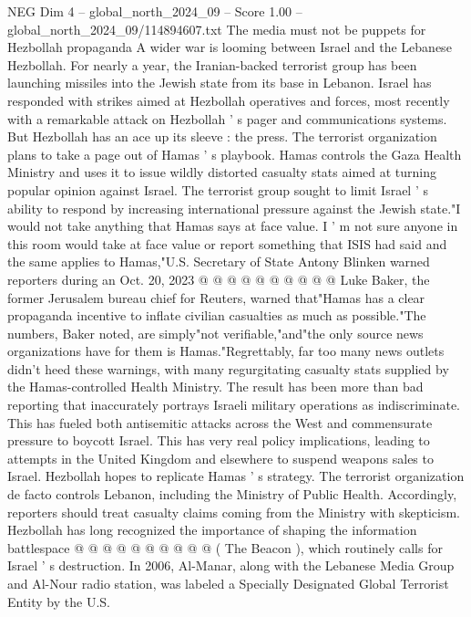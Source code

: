 \begin{textsample}{NEG Dim 4 – global\_north\_2024\_09 – Score 1.00 – global\_north\_2024\_09/114894607.txt}  \label{ex:f4_neg_132}
The media must not be puppets for Hezbollah propaganda A wider war is looming between Israel and the Lebanese Hezbollah.
For nearly a year, the Iranian-backed terrorist group has been launching missiles into the Jewish state from its base in Lebanon.
Israel has responded with strikes aimed at Hezbollah operatives and forces, most recently with a remarkable attack on Hezbollah ' s pager and communications systems.
But Hezbollah has an ace up its sleeve : the press.
The terrorist organization plans to take a page out of Hamas ' s playbook.
Hamas controls the Gaza Health Ministry and uses it to issue wildly distorted casualty stats aimed at turning popular opinion against Israel.
The terrorist group sought to limit Israel ' s ability to respond by increasing international pressure against the Jewish state."I would not take anything that Hamas says at face value.
I ' m not sure anyone in this room would take at face value or report something that ISIS had said and the same applies to Hamas,"U.S.
Secretary of State Antony Blinken warned reporters during an Oct. 20, 2023 @ @ @ @ @ @ @ @ @ @ Luke Baker, the former Jerusalem bureau chief for Reuters, warned that"Hamas has a clear propaganda incentive to inflate civilian casualties as much as possible."The numbers, Baker noted, are simply"not verifiable,"and"the only source news organizations have for them is Hamas."Regrettably, far too many news outlets didn't heed these warnings, with many regurgitating casualty stats supplied by the Hamas-controlled Health Ministry.
The result has been more than bad reporting that inaccurately portrays Israeli military operations as indiscriminate.
This has fueled both antisemitic attacks across the West and commensurate pressure to boycott Israel.
This has very real policy implications, leading to attempts in the United Kingdom and elsewhere to suspend weapons sales to Israel.
Hezbollah hopes to replicate Hamas ' s strategy.
The terrorist organization de facto controls Lebanon, including the Ministry of Public Health.
Accordingly, reporters should treat casualty claims coming from the Ministry with skepticism.
Hezbollah has long recognized the importance of shaping the information battlespace @ @ @ @ @ @ @ @ @ @ ( The Beacon ), which routinely calls for Israel ' s destruction.
In 2006, Al-Manar, along with the Lebanese Media Group and Al-Nour radio station, was labeled a Specially Designated Global Terrorist Entity by the U.S.

\end{textsample}
